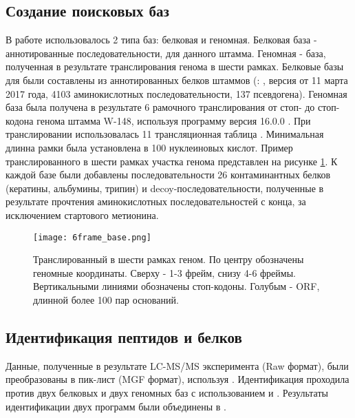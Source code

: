 \subsection{Создание поисковых баз}
В работе использовалось 2 типа баз: белковая и геномная. Белковая база - аннотированные последовательности, для данного штамма. Геномная - база, полученная в результате транслирования генома в шести рамках.
Белковые базы для  были составлены из аннотированных белков штаммов (: , версия от 11 марта 2017 года, 4103 аминокислотных последовательности, 137 псевдогена).
Геномная база была получена в результате 6 рамочного транслирования от стоп- до стоп-кодона генома штамма  W-148, используя программу  версия 16.0.0 \cite{rutherford2000artemis}. При транслировании использовалась 11 трансляционная таблица . Минимальная длинна рамки была установлена в 100 нуклеиновых кислот. Пример транслированного в шести рамках участка генома представлен на рисунке \ref{6frame_base}.
К каждой базе были добавлены последовательности 26 контаминантных белков (кератины, альбумины, трипин) и decoy-последовательности, полученные в результате прочтения аминокислотных последовательностей с конца, за исключением стартового метионина. 

\begin{figure}[h!]
    \begin{center}
        \texttt{[image: 6frame\_base.png]}
    \end{center}
\caption[foo bar]{Транслированный в шести рамках геном. По центру обозначены геномные координаты. Сверху - 1-3 фрейм, снизу 4-6 фреймы. Вертикальными линиями обозначены стоп-кодоны. Голубым - ORF, длинной более 100 пар оснований.}
\label{6frame_base}
\end{figure}

\subsection{Идентификация пептидов и белков}
Данные, полученные в результате LC-MS/MS эксперимента (Raw формат), были преобразованы в пик-лист (MGF формат), используя  \cite{chambers2012cross}. Идентификация проходила против двух белковых и двух геномных баз с использованием  \cite{cottrell1999probability} и  \cite{fenyo2003method}. Результаты идентификации двух программ были объединены в . 

